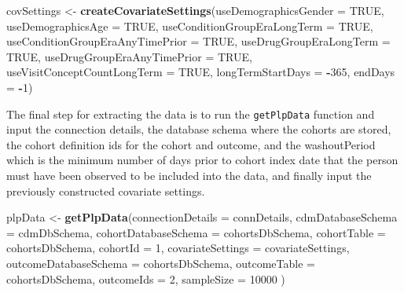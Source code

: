 \documentclass[]{book}
\newenvironment{Shaded}{\begin{snugshade}}{\end{snugshade}}
\newcommand{\KeywordTok}[1]{\textcolor[rgb]{0.13,0.29,0.53}{\textbf{#1}}}
\newcommand{\DataTypeTok}[1]{\textcolor[rgb]{0.13,0.29,0.53}{#1}}
\newcommand{\DecValTok}[1]{\textcolor[rgb]{0.00,0.00,0.81}{#1}}
\newcommand{\StringTok}[1]{\textcolor[rgb]{0.31,0.60,0.02}{#1}}
\newcommand{\OtherTok}[1]{\textcolor[rgb]{0.56,0.35,0.01}{#1}}
\newcommand{\OperatorTok}[1]{\textcolor[rgb]{0.81,0.36,0.00}{\textbf{#1}}}
\newcommand{\NormalTok}[1]{#1}
\begin{document}
\begin{Shaded}
\begin{Highlighting}[]
\NormalTok{covSettings <-}\StringTok{ }\KeywordTok{createCovariateSettings}\NormalTok{(}\DataTypeTok{useDemographicsGender =} \OtherTok{TRUE}\NormalTok{,}
                                       \DataTypeTok{useDemographicsAge =} \OtherTok{TRUE}\NormalTok{,}
                                       \DataTypeTok{useConditionGroupEraLongTerm =} \OtherTok{TRUE}\NormalTok{,}
                                       \DataTypeTok{useConditionGroupEraAnyTimePrior =} \OtherTok{TRUE}\NormalTok{,}
                                       \DataTypeTok{useDrugGroupEraLongTerm =} \OtherTok{TRUE}\NormalTok{,}
                                       \DataTypeTok{useDrugGroupEraAnyTimePrior =} \OtherTok{TRUE}\NormalTok{,}
                                       \DataTypeTok{useVisitConceptCountLongTerm =} \OtherTok{TRUE}\NormalTok{,}
                                       \DataTypeTok{longTermStartDays =} \OperatorTok{-}\DecValTok{365}\NormalTok{,}
                                       \DataTypeTok{endDays =} \OperatorTok{-}\DecValTok{1}\NormalTok{)}
\end{Highlighting}
\end{Shaded}

The final step for extracting the data is to run the \texttt{getPlpData}
function and input the connection details, the database schema where the
cohorts are stored, the cohort definition ids for the cohort and
outcome, and the washoutPeriod which is the minimum number of days prior
to cohort index date that the person must have been observed to be
included into the data, and finally input the previously constructed
covariate settings.

\begin{Shaded}
\begin{Highlighting}[]
\NormalTok{plpData <-}\StringTok{ }\KeywordTok{getPlpData}\NormalTok{(}\DataTypeTok{connectionDetails =}\NormalTok{ connDetails,}
                      \DataTypeTok{cdmDatabaseSchema =}\NormalTok{ cdmDbSchema,}
                      \DataTypeTok{cohortDatabaseSchema =}\NormalTok{ cohortsDbSchema,}
                      \DataTypeTok{cohortTable =}\NormalTok{ cohortsDbSchema,}
                      \DataTypeTok{cohortId =} \DecValTok{1}\NormalTok{,}
                      \DataTypeTok{covariateSettings =}\NormalTok{ covariateSettings,}
                      \DataTypeTok{outcomeDatabaseSchema =}\NormalTok{ cohortsDbSchema,}
                      \DataTypeTok{outcomeTable =}\NormalTok{ cohortsDbSchema,}
                      \DataTypeTok{outcomeIds =} \DecValTok{2}\NormalTok{,}
                      \DataTypeTok{sampleSize =} \DecValTok{10000}
\NormalTok{)}
\end{Highlighting}
\end{Shaded}
\end{document}
